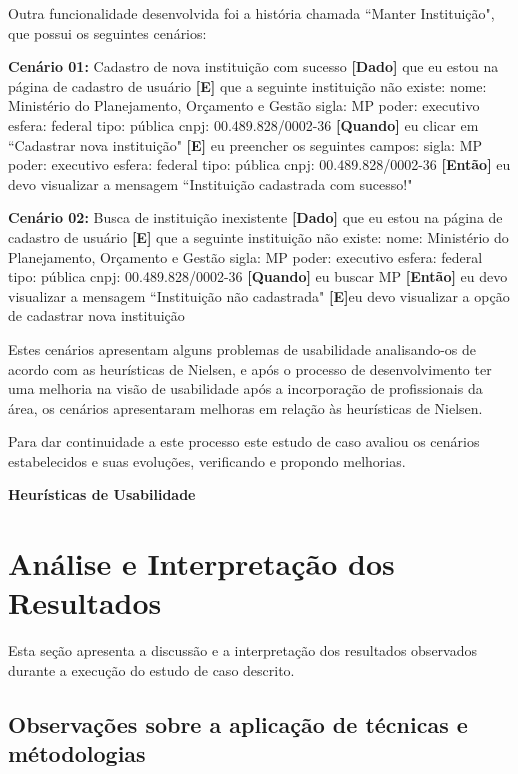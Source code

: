 Outra funcionalidade desenvolvida foi a história chamada ``Manter Instituição", que possui os seguintes cenários:

\textbf{Cenário 01:} Cadastro de nova instituição com sucesso
\textbf{[Dado]} que eu estou na página de cadastro de usuário
\textbf{[E]} que a seguinte instituição não existe:
  	nome: Ministério do Planejamento, Orçamento e Gestão
  	sigla: MP
 	poder: executivo
 	esfera: federal
  	tipo: pública
  	cnpj: 00.489.828/0002-36
\textbf{[Quando]} eu clicar em ``Cadastrar nova instituição" 
\textbf{[E]} eu preencher os seguintes campos:
  	sigla: MP
  	poder: executivo
  	esfera: federal
  	tipo: pública
  	cnpj: 00.489.828/0002-36
\textbf{[Então]} eu devo visualizar a mensagem ``Instituição cadastrada com sucesso!"

\textbf{Cenário 02:} Busca de instituição inexistente
\textbf{[Dado]} que eu estou na página de cadastro de usuário
\textbf{[E]} que a seguinte instituição não existe:
  nome: Ministério do Planejamento, Orçamento e Gestão
  sigla: MP
  poder: executivo
  esfera: federal
  tipo: pública
  cnpj: 00.489.828/0002-36
\textbf{[Quando]} eu buscar MP
\textbf{[Então]} eu devo visualizar a mensagem ``Instituição não cadastrada" 
\textbf{[E]}eu devo visualizar a opção de cadastrar nova instituição

Estes cenários apresentam alguns problemas de usabilidade analisando-os de acordo com as heurísticas de Nielsen, e após o processo de desenvolvimento ter uma melhoria na visão de usabilidade após a incorporação de profissionais da área, os cenários apresentaram melhoras em relação às heurísticas de Nielsen. 



Para dar continuidade a este processo este estudo de caso avaliou os cenários estabelecidos e suas evoluções, verificando e propondo melhorias.

\textbf{Heurísticas de Usabilidade}


\section{Análise e Interpretação dos Resultados}

Esta seção apresenta a discussão e a interpretação dos resultados observados durante a execução do estudo de caso descrito.

\subsection{Observações sobre a aplicação de técnicas e métodologias}

